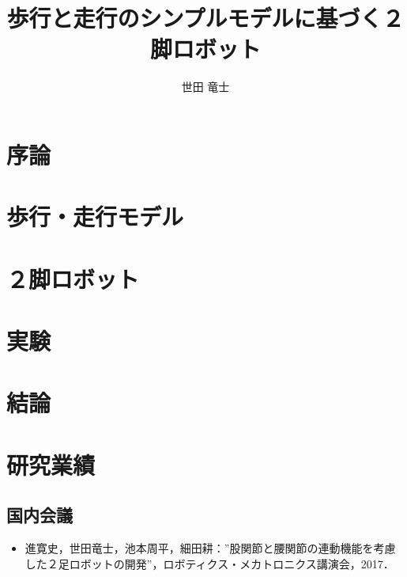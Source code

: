 \documentclass[12pt]{jarticle}
\title{歩行と走行のシンプルモデルに基づく２脚ロボット}
\author{世田 竜士}
\begin{document}
\setlength{\abovecaptionskip}{0mm}
\titlepage
\begin{abstract}
 
\end{abstract}
\tableofcontents

\section{序論}

\clearpage

\section{歩行・走行モデル}

\clearpage

\section{２脚ロボット}

\clearpage

\section{実験}

\clearpage

\section{結論}

\clearpage



\Acknowledgment

\clearpage

\section*{研究業績}
\subsection*{国内会議}
\begin{itemize}
 \item[\labelitemiv] 進寛史，世田竜士，池本周平，細田耕：”股関節と腰関節の連動機能を考慮した２足ロボットの開発”，ロボティクス・メカトロニクス講演会，2017．
\end{itemize}


\end{document}
